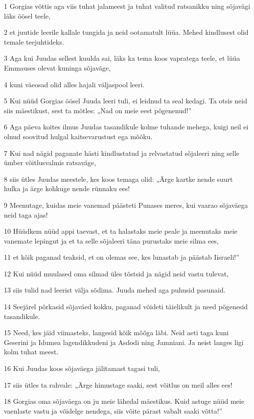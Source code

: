 \par 1 Gorgias võttis aga viis tuhat jalameest ja tuhat valitud ratsanikku ning sõjavägi läks öösel teele,
\par 2 et juutide leerile kallale tungida ja neid ootamatult lüüa. Mehed kindlusest olid temale teejuhtideks.
\par 3 Aga kui Juudas sellest kuulda sai, läks ka tema koos vapratega teele, et lüüa Emmauses olevat kuninga sõjaväge,
\par 4 kuni väeosad olid alles hajali väljaspool leeri.
\par 5 Kui nüüd Gorgias öösel Juuda leeri tuli, ei leidnud ta seal kedagi. Ta otsis neid siis mäestikust, sest ta mõtles: „Nad on meie eest põgenenud!”
\par 6 Aga päeva koites ilmus Juudas tasandikule kolme tuhande mehega, kuigi neil ei olnud soovitud hulgal kaitsevarustust ega mõõku.
\par 7 Kui nad nägid paganate hästi kindlustatud ja relvastatud sõjaleeri ning selle ümber võitlusvalmis ratsaväge,
\par 8 siis ütles Juudas meestele, kes koos temaga olid: „Ärge kartke nende suurt hulka ja ärge kohkuge nende rünnaku ees!
\par 9 Meenutage, kuidas meie vanemad päästeti Punases meres, kui vaarao sõjaväega neid taga ajas!
\par 10 Hüüdkem nüüd appi taevast, et ta halastaks meie peale ja meenutaks meie vanemate lepingut ja et ta selle sõjaleeri täna purustaks meie silma ees,
\par 11 et kõik paganad teaksid, et on olemas see, kes lunastab ja päästab Iisraeli!”
\par 12 Kui nüüd muulased oma silmad üles tõstsid ja nägid neid vastu tulevat,
\par 13 siis tulid nad leerist välja sõdima. Juuda mehed aga puhusid pasunaid.
\par 14 Seejärel põrkasid sõjaväed kokku, paganad võideti täielikult ja need põgenesid tasandikule.
\par 15 Need, kes jäid viimasteks, langesid kõik mõõga läbi. Neid aeti taga kuni Geserini ja Idumea lagendikkudeni ja Asdodi ning Jamniani. Ja neist langes ligi kolm tuhat meest.
\par 16 Kui Juudas koos sõjaväega jälitamast tagasi tuli,
\par 17 siis ütles ta rahvale: „Ärge himustage saaki, sest võitlus on meil alles ees!
\par 18 Gorgias oma sõjaväega on ju meie lähedal mäestikus. Kuid astuge nüüd meie vaenlaste vastu ja võidelge nendega, siis võite pärast vabalt saaki võtta!”
